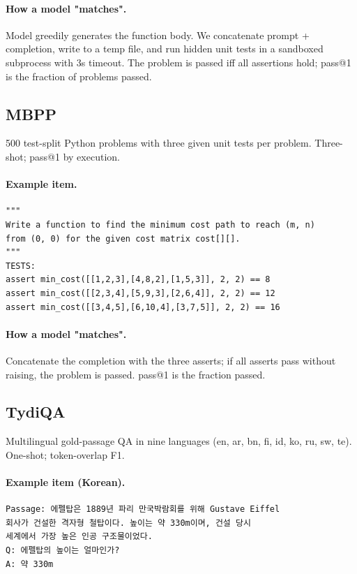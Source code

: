 \paragraph{How a model "matches".} Model greedily generates the
function body. We concatenate prompt + completion, write to a
temp file, and run hidden unit tests in a sandboxed subprocess
with 3s timeout. The problem is passed iff all assertions hold;
pass@1 is the fraction of problems passed.

\subsection{MBPP}
\label{app:ex-mbpp}

500 test-split Python problems with three given unit tests per
problem. Three-shot; pass@1 by execution.

\paragraph{Example item.}
\begin{verbatim}
"""
Write a function to find the minimum cost path to reach (m, n)
from (0, 0) for the given cost matrix cost[][].
"""
TESTS:
assert min_cost([[1,2,3],[4,8,2],[1,5,3]], 2, 2) == 8
assert min_cost([[2,3,4],[5,9,3],[2,6,4]], 2, 2) == 12
assert min_cost([[3,4,5],[6,10,4],[3,7,5]], 2, 2) == 16
\end{verbatim}

\paragraph{How a model "matches".} Concatenate the completion with
the three asserts; if all asserts pass without raising, the problem
is passed. pass@1 is the fraction passed.

\subsection{TydiQA}
\label{app:ex-tydiqa}

Multilingual gold-passage QA in nine languages (en, ar, bn, fi, id,
ko, ru, sw, te). One-shot; token-overlap F1.

\paragraph{Example item (Korean).}
\begin{verbatim}
Passage: 에펠탑은 1889년 파리 만국박람회를 위해 Gustave Eiffel
회사가 건설한 격자형 철탑이다. 높이는 약 330m이며, 건설 당시
세계에서 가장 높은 인공 구조물이었다.
Q: 에펠탑의 높이는 얼마인가?
A: 약 330m
\end{verbatim}

